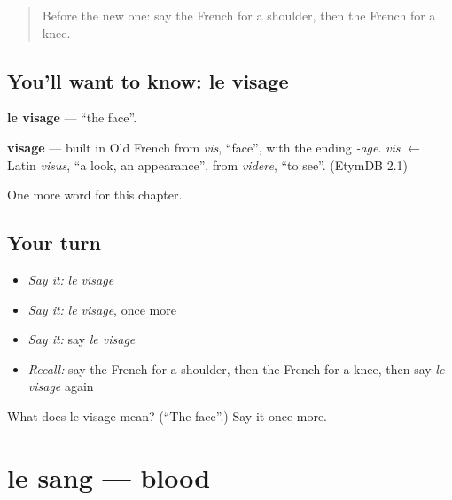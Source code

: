 \label{lesson:FR-C50-visage}



\begin{quote}
Before the new one: say the French for a shoulder, then the French for a knee.
\end{quote}

\subsection*{You'll want to know: le visage}
\textbf{le visage} — \textquotedblleft{}the face\textquotedblright{}.

\begin{cousinweb}
\textbf{visage} — built in Old French from \emph{vis}, \textquotedblleft{}face\textquotedblright{}, with the ending \emph{-age}. \emph{vis} $\leftarrow$ Latin \emph{visus}, \textquotedblleft{}a look, an appearance\textquotedblright{}, from \emph{videre}, \textquotedblleft{}to see\textquotedblright{}. (EtymDB 2.1)
\end{cousinweb}

\begin{grammarlens}[title={What you've built}]
One more word for this chapter.
\end{grammarlens}

\subsection*{Your turn}
\begin{itemize}
\raggedright
  \item \emph{Say it:} \emph{le visage}
  \item \emph{Say it:} \emph{le visage}, once more
  \item \emph{Say it:} say \emph{le visage}
  \item \emph{Recall:} say the French for a shoulder, then the French for a knee, then say \emph{le visage} again
\end{itemize}

\begin{tcolorbox}[breakable,colback=teal!4,colframe=teal!35!black,title={Before you move on}]
What does le visage mean? (\textquotedblleft{}The face\textquotedblright{}.) Say it once more.
\end{tcolorbox}
\section[le sang]{le sang — blood}

